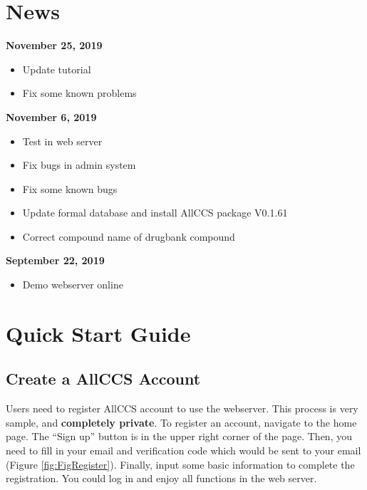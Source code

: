 \documentclass[12pt,]{book}
\providecommand{\tightlist}{%
  \setlength{\itemsep}{0pt}\setlength{\parskip}{0pt}}
\theoremstyle{definition}
\theoremstyle{definition}
\theoremstyle{definition}
\theoremstyle{remark}
\begin{document}
\chapter*{News}\label{news}

\textbf{November 25, 2019}

\begin{itemize}
\tightlist
\item
  Update tutorial
\item
  Fix some known problems
\end{itemize}

\textbf{November 6, 2019}

\begin{itemize}
\tightlist
\item
  Test in web server
\item
  Fix bugs in admin system
\item
  Fix some known bugs
\item
  Update formal database and install AllCCS package V0.1.61
\item
  Correct compound name of drugbank compound 
\end{itemize}

\textbf{September 22, 2019}

\begin{itemize}
\tightlist
\item
  Demo webserver online
\end{itemize}

\chapter{Quick Start Guide}\label{quick-start-guide}

\section{Create a AllCCS Account}\label{create-a-allccs-account}

Users need to register AllCCS account to use the webserver. This process
is very sample, and \textbf{completely private}. To register an account,
navigate to the home page. The ``Sign up'' button is in the upper right
corner of the page. Then, you need to fill in your email and
verification code which would be sent to your email (Figure
\ref{fig:FigRegister}). Finally, input some basic information to
complete the registration. You could log in and enjoy all functions in
the web server.
\end{document}
